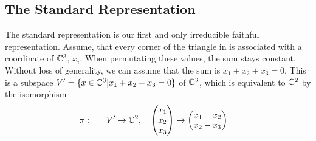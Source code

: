 \subsection{The Standard Representation}

The standard representation is our first and only irreducible faithful representation.
Assume, that every corner of the triangle in  is associated with a coordinate of $\mathbb{C}^3$, $x_i$.
When permutating these values, the sum stays constant.
Without loss of generality, we can assume that the sum is $x_1 + x_2 + x_3 = 0$.
This is a subspace $V' = \{x \in \mathbb{C}^3 | x_1 + x_2 + x_3 = 0\}$ of $\mathbb{C}^3$, which is equivalent to $\mathbb{C}^2$ by the isomorphism
\begin{align}
    \pi: \qquad & V' \to \mathbb{C}^2, \quad \begin{pmatrix}
        x_1 \\ x_2 \\ x_3
    \end{pmatrix} \mapsto \begin{pmatrix}
        x_1 - x_2 \\
        x_2 - x_3
    \end{pmatrix}
\end{align}

